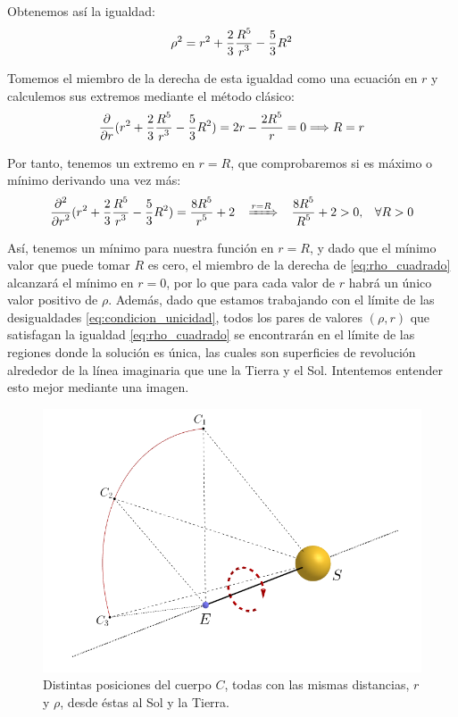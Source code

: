 Obtenemos así la igualdad:
\begin{align}
\rho^2=r^2+\frac{\displaystyle 2}{\displaystyle 3}\frac{\displaystyle R^5}{\displaystyle r^3}-\frac{\displaystyle 5}{\displaystyle 3}R^2
\label{eq:rho_cuadrado}
\end{align}

Tomemos el miembro de la derecha de esta igualdad como una ecuación en $r$ y calculemos sus extremos mediante el método clásico:
\[
\frac{\displaystyle \partial}{\displaystyle \partial r} (r^2+\frac{\displaystyle 2}{\displaystyle 3}\frac{\displaystyle R^5}{\displaystyle r^3}-\frac{\displaystyle 5}{\displaystyle 3}R^2)=2r-\frac{\displaystyle 2R^5}{\displaystyle r}=0 \Longrightarrow R=r
\]

Por tanto, tenemos un extremo en $r=R$, que comprobaremos si es máximo o mínimo derivando una vez más:
\[
\frac{\displaystyle \partial^2}{\displaystyle \partial r^2}(r^2+\frac{\displaystyle 2}{\displaystyle 3}\frac{\displaystyle R^5}{\displaystyle r^3}-\frac{\displaystyle 5}{\displaystyle 3}R^2)=\frac{\displaystyle 8R^5}{\displaystyle r^5}+2
 \; \; \; \xRightarrow[]{r=R} \; \; \; \frac{\displaystyle 8R^5}{\displaystyle R^5}+2>0, \; \; \; \forall R>0
\]

Así, tenemos un mínimo para nuestra función en $r=R$, y dado que el mínimo valor que puede tomar $R$ es cero, el miembro de la derecha de \eqref{eq:rho_cuadrado} alcanzará el mínimo en $r=0$, por lo que para cada valor de $r$ habrá un único valor positivo de $\rho$. Además, dado que estamos trabajando con el límite de las desigualdades \eqref{eq:condicion_unicidad}, todos los pares de valores $(\rho,r)$ que satisfagan la igualdad \eqref{eq:rho_cuadrado} se encontrarán en el límite de las regiones donde la solución es única, las cuales son superficies de revolución alrededor de la línea imaginaria que une la Tierra y el Sol. Intentemos entender esto mejor mediante una imagen.
\begin{figure}[H]
\centering
\includegraphics[scale=0.4]{images/eje_rotacion.png}
\caption{Distintas posiciones del cuerpo $C$, todas con las mismas distancias, $r$ y $\rho$, desde éstas al Sol y la Tierra.}
\label{fig:eje_rotacion}
\end{figure}

